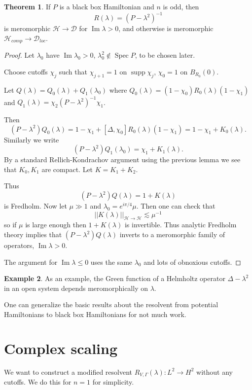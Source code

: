 \documentclass[12pt]{report}
\newcommand{\Spec}{\operatorname{Spec}}
\newcommand{\supp}{\operatorname{supp}}
\renewcommand{\Im}{\operatorname{Im}}
\theoremstyle{definition}
\newtheorem{theorem}{Theorem}[chapter]
\newtheorem{example}[theorem]{Example}
\begin{document}
\begin{theorem}
If $P$ is a black box Hamiltonian and $n$ is odd, then
$$R(\lambda) = (P - \lambda^2)^{-1}$$
is meromorphic $\mathcal H \to \mathcal D$ for $\Im \lambda > 0$, and otherwise is meromorphic $\mathcal H_{comp} \to \mathcal D_{loc}$.
\end{theorem}
\begin{proof}
Let $\lambda_0$ have $\Im \lambda_0 > 0$, $\lambda_0^2 \notin \Spec P$, to be chosen later.

Choose cutoffs $\chi_j$ such that $\chi_{j+1} = 1$ on $\supp \chi_j$, $\chi_0 = 1$ on $B_{R_0}(0)$.

Let $Q(\lambda) = Q_0(\lambda) + Q_1(\lambda_0)$ where $Q_0(\lambda) = (1 - \chi_0)R_0(\lambda)(1 - \chi_1)$ and $Q_1(\lambda) = \chi_2(P - \lambda^2)^{-1}\chi_1$.

Then
$$(P - \lambda^2)Q_0(\lambda) = 1 - \chi_1 + [\Delta, \chi_0]R_0(\lambda)(1 - \chi_1) = 1 - \chi_1 + K_0(\lambda).$$
Similarly we write
$$(P - \lambda^2)Q_1(\lambda_0) = \chi_1 + K_1(\lambda).$$
By a standard Rellich-Kondrachov argument using the previous lemma we see that $K_0,K_1$ are compact. Let $K = K_1 + K_2$.

Thus
$$(P - \lambda^2)Q(\lambda) = 1 + K(\lambda)$$
is Fredholm. Now let $\mu \gg 1$ and $\lambda_0 = e^{i\pi/4}\mu$. Then one can check that
$$||K(\lambda)||_{\mathcal H \to \mathcal H} \lesssim \mu^{-1}$$
so if $\mu$ is large enough then $1 + K(\lambda)$ is invertible.
Thus analytic Fredholm theory implies that $(P - \lambda^2)Q(\lambda)$ inverts to a meromorphic family of operators, $\Im \lambda > 0$.

The argument for $\Im \lambda \leq 0$ uses the same $\lambda_0$ and lots of obnoxious cutoffs.
\end{proof}

\begin{example}
As an example, the Green function of a Helmholtz operator $\Delta - \lambda^2$ in an open system depends meromorphically on $\lambda$.
\end{example}

One can generalize the basic results about the resolvent from potential Hamiltonians to black box Hamiltonians for not much work.

\section{Complex scaling}
We want to construct a modified resolvent $R_{V, \Gamma}(\lambda): L^2 \to H^2$ without any cutoffs. We do this for $n = 1$ for simplicity.
\end{document}
